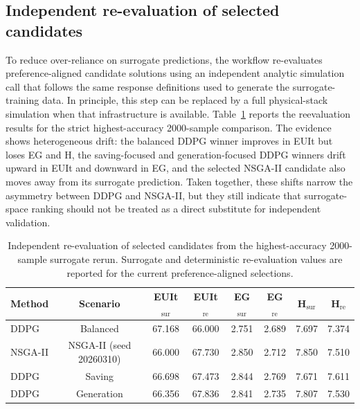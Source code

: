 \subsection{Independent re-evaluation of selected candidates}

To reduce over-reliance on surrogate predictions, the workflow re-evaluates preference-aligned candidate solutions using an independent analytic simulation call that follows the same response definitions used to generate the surrogate-training data. In principle, this step can be replaced by a full physical-stack simulation when that infrastructure is available. Table~\ref{tab:supp_reeval} reports the reevaluation results for the strict highest-accuracy 2000-sample comparison. The evidence shows heterogeneous drift: the balanced DDPG winner improves in EUIt but loses EG and H, the saving-focused and generation-focused DDPG winners drift upward in EUIt and downward in EG, and the selected NSGA-II candidate also moves away from its surrogate prediction. Taken together, these shifts narrow the asymmetry between DDPG and NSGA-II, but they still indicate that surrogate-space ranking should not be treated as a direct substitute for independent validation.

\begin{table}[H]
\centering
\caption{Independent re-evaluation of selected candidates from the highest-accuracy 2000-sample surrogate rerun. Surrogate and deterministic re-evaluation values are reported for the current preference-aligned selections.}
\label{tab:supp_reeval}
\begin{threeparttable}
\footnotesize
\begin{tabular*}{\linewidth}{@{\extracolsep{\fill}}lccccccc@{}}
\toprule
Method & Scenario & EUIt$_\mathrm{sur}$ & EUIt$_\mathrm{re}$ & EG$_\mathrm{sur}$ & EG$_\mathrm{re}$ & H$_\mathrm{sur}$ & H$_\mathrm{re}$ \\
\midrule
DDPG & Balanced & 67.168 & 66.000 & 2.751 & 2.689 & 7.697 & 7.374 \\
NSGA-II & NSGA-II (seed 20260310) & 66.000 & 67.730 & 2.850 & 2.712 & 7.850 & 7.510 \\
DDPG & Saving & 66.698 & 67.473 & 2.844 & 2.769 & 7.671 & 7.611 \\
DDPG & Generation & 66.356 & 67.836 & 2.841 & 2.735 & 7.807 & 7.530 \\
\bottomrule
\end{tabular*}
\end{threeparttable}
\end{table}

